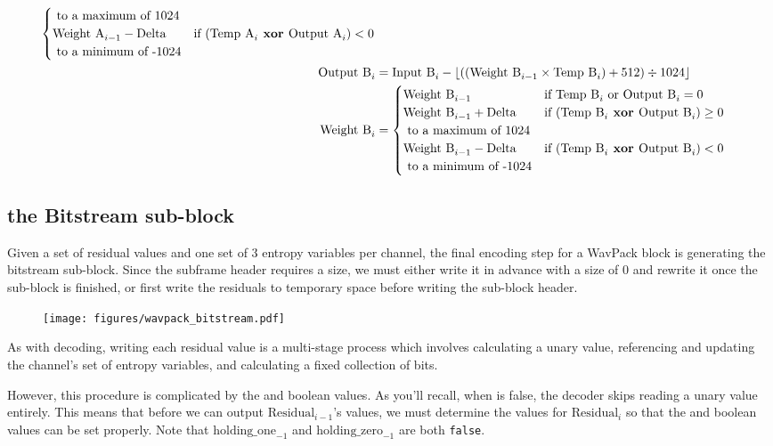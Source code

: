 \begin{align*}
\begin{cases}
\text{ to a maximum of 1024} \\
\text{Weight A}_{i - 1} - \text{Delta} & \text{if } (\text{Temp A}_i \textbf{ xor } \text{Output A}_i) < 0 \\
\text{ to a minimum of -1024}
\end{cases} \\
\text{Output B}_i &= \text{Input B}_i - \lfloor((\text{Weight B}_{i - 1} \times \text{Temp B}_i) + 512) \div 1024\rfloor \\
\text{Weight B}_i &=
\begin{cases}
\text{Weight B}_{i - 1} & \text{if } \text{Temp B}_i \text{ or } \text{Output B}_i = 0 \\
\text{Weight B}_{i - 1} + \text{Delta} & \text{if } (\text{Temp B}_i \textbf{ xor } \text{Output B}_i) \geq 0 \\
\text{ to a maximum of 1024} \\
\text{Weight B}_{i - 1} - \text{Delta} & \text{if } (\text{Temp B}_i \textbf{ xor } \text{Output B}_i) < 0 \\
\text{ to a minimum of -1024}
\end{cases}
\end{align*}

\clearpage

\subsection{the Bitstream sub-block}

Given a set of residual values and one set of 3 entropy variables per
channel, the final encoding step for a WavPack block is generating
the bitstream sub-block.
Since the subframe header requires a size, we must either
write it in advance with a size of 0 and rewrite it once
the sub-block is finished, or first write the residuals to temporary space
before writing the sub-block header.

\begin{figure}[h]
\texttt{[image: figures/wavpack\_bitstream.pdf]}
\end{figure}

As with decoding, writing each residual value is a multi-stage
process which involves calculating a unary value,
referencing and updating the channel's set of entropy variables, and
calculating a fixed collection of bits.

However, this procedure is complicated by the 
and  boolean values.
As you'll recall, when  is false, the
decoder skips reading a unary value entirely.
This means that before we can output $\text{Residual}_{i - 1}$'s values,
we must determine the values for $\text{Residual}_i$
so that the  and  boolean
values can be set properly.
Note that $\text{holding\_one}_{-1}$ and $\text{holding\_zero}_{-1}$
are both \texttt{false}.

